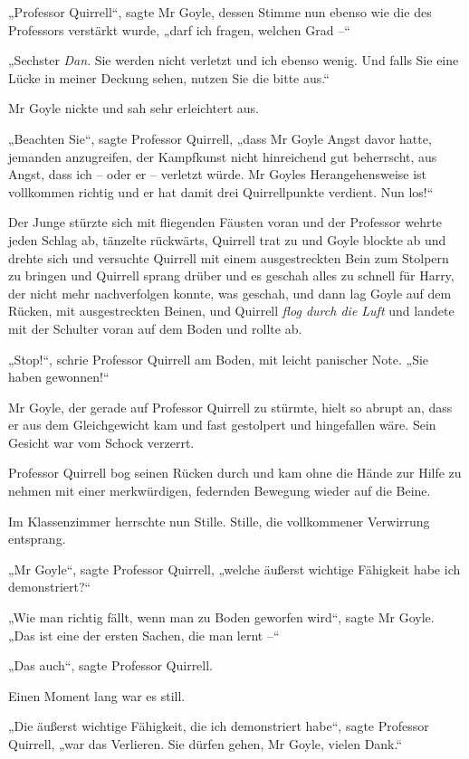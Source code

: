 {„Professor Quirrell“, sagte Mr Goyle, dessen Stimme nun ebenso wie die des Professors verstärkt wurde, „darf ich fragen, welchen Grad --“

„Sechster \emph{Dan}. Sie werden nicht verletzt und ich ebenso wenig. Und falls Sie eine Lücke in meiner Deckung sehen, nutzen Sie die bitte aus.“

Mr Goyle nickte und sah sehr erleichtert aus.

„Beachten Sie“, sagte Professor Quirrell, „dass Mr Goyle Angst davor hatte, jemanden anzugreifen, der Kampfkunst nicht hinreichend gut beherrscht, aus Angst, dass ich -- oder er -- verletzt würde. Mr Goyles Herangehensweise ist vollkommen richtig und er hat damit drei Quirrellpunkte verdient. Nun los!“

Der Junge stürzte sich mit fliegenden Fäusten voran und der Professor wehrte jeden Schlag ab, tänzelte rückwärts, Quirrell trat zu und Goyle blockte ab und drehte sich und versuchte Quirrell mit einem ausgestreckten Bein zum Stolpern zu bringen und Quirrell sprang drüber und es geschah alles zu schnell für Harry, der nicht mehr nachverfolgen konnte, was geschah, und dann lag Goyle auf dem Rücken, mit ausgestreckten Beinen, und Quirrell \emph{flog durch die Luft} und landete mit der Schulter voran auf dem Boden und rollte ab.

„Stop!“, schrie Professor Quirrell am Boden, mit leicht panischer Note. „Sie haben gewonnen!“

Mr Goyle, der gerade auf Professor Quirrell zu stürmte, hielt so abrupt an, dass er aus dem Gleichgewicht kam und fast gestolpert und hingefallen wäre. Sein Gesicht war vom Schock verzerrt.

Professor Quirrell bog seinen Rücken durch und kam ohne die Hände zur Hilfe zu nehmen mit einer merkwürdigen, federnden Bewegung wieder auf die Beine.

Im Klassenzimmer herrschte nun Stille. Stille, die vollkommener Verwirrung entsprang.

„Mr Goyle“, sagte Professor Quirrell, „welche äußerst wichtige Fähigkeit habe ich demonstriert?“

„Wie man richtig fällt, wenn man zu Boden geworfen wird“, sagte Mr Goyle. „Das ist eine der ersten Sachen, die man lernt --“

„Das auch“, sagte Professor Quirrell.

Einen Moment lang war es still.

„Die äußerst wichtige Fähigkeit, die ich demonstriert habe“, sagte Professor Quirrell, „war das Verlieren. Sie dürfen gehen, Mr Goyle, vielen Dank.“

}

